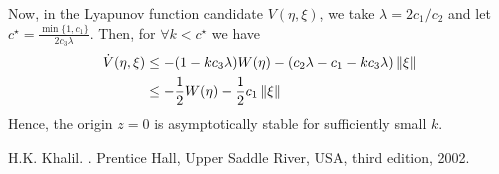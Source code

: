 \documentclass[a4 paper, 12pt]{article}
\begin{document}
Now, in the Lyapunov function candidate $V(\eta,\xi)$, we take $\lambda = 2c_1/c_2$ and let $c^\star = \frac{\min\{1,c_1\}}{2c_3\lambda}$. Then, for $\forall k<c^\star$ we have
\begin{equation}
        \begin{aligned}
                \dot{V}(\eta,\xi) &\leq -(1-kc_3\lambda)W(\eta) - (c_2\lambda - c_1 - kc_3\lambda)\left\|\xi\right\| \\
                &\leq -\frac{1}{2} W(\eta) - \frac{1}{2} c_1\left\|\xi\right\|
        \end{aligned}
\end{equation}
Hence, the origin $z=0$ is asymptotically stable for sufficiently small $k$.



\begin{thebibliography}{99}

         H.K. Khalil. . Prentice Hall, Upper Saddle River, USA, third edition, 2002.

            
\end{thebibliography}
\end{document}

